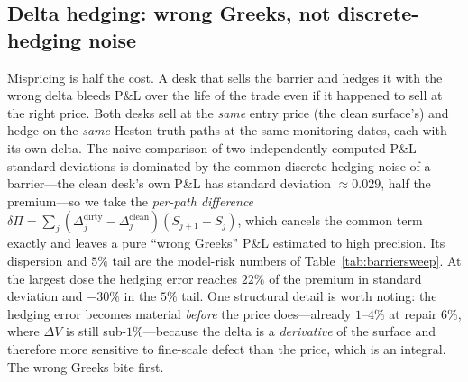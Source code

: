 

\subsection{Delta hedging: wrong Greeks, not discrete-hedging noise}\label{sec:barrierhedge}

Mispricing is half the cost. A desk that sells the barrier and hedges it with the wrong delta
bleeds P\&L over the life of the trade even if it happened to sell at the right price. Both
desks sell at the \emph{same} entry price (the clean surface's) and hedge on the \emph{same}
Heston truth paths at the same monitoring dates, each with its own delta. The naive comparison
of two independently computed P\&L standard deviations is dominated by the common
discrete-hedging noise of a barrier---the clean desk's own P\&L has standard deviation
$\approx0.029$, half the premium---so we take the \emph{per-path difference}
$\delta\Pi=\sum_j(\Delta_j^{\mathrm{dirty}}-\Delta_j^{\mathrm{clean}})(S_{j+1}-S_j)$, which
cancels the common term exactly and leaves a pure ``wrong Greeks'' P\&L estimated to high
precision. Its dispersion and $5\%$ tail are the model-risk numbers of
Table~\ref{tab:barriersweep}. At the largest dose the hedging error reaches $22\%$ of the
premium in standard deviation and $-30\%$ in the $5\%$ tail. One structural detail is worth
noting: the hedging error becomes material \emph{before} the price does---already
$1$--$4\%$ at repair $6\%$, where $\Delta V$ is still sub-$1\%$---because the delta is a
\emph{derivative} of the surface and therefore more sensitive to fine-scale defect than the
price, which is an integral. The wrong Greeks bite first.

